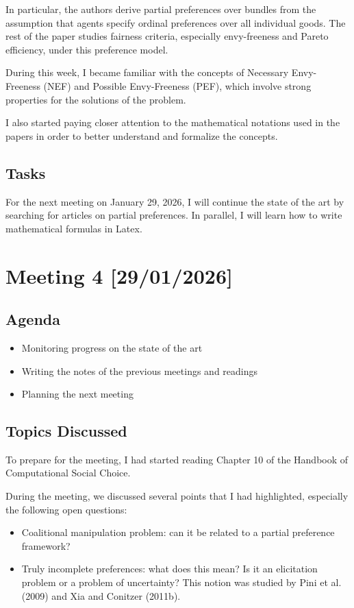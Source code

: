 \documentclass{article}
\begin{document}
In particular, the authors derive partial preferences over bundles from the assumption that agents specify ordinal preferences over all individual goods.
The rest of the paper studies fairness criteria, especially envy-freeness and Pareto efficiency, under this preference model.

During this week, I became familiar with the concepts of Necessary Envy-Freeness (NEF) and Possible Envy-Freeness (PEF), which involve strong properties for the solutions of the problem.

I also started paying closer attention to the mathematical notations used in the papers in order to better understand and formalize the concepts.

\subsection{Tasks}
For the next meeting on January 29, 2026, I will continue the state of the art by searching for articles on partial preferences.
In parallel, I will learn how to write mathematical formulas in Latex.
\newpage


\section{Meeting 4 [29/01/2026]}

\subsection{Agenda}
\begin{itemize}
    \item Monitoring progress on the state of the art
    \item Writing the notes of the previous meetings and readings
    \item Planning the next meeting
\end{itemize}

\subsection{Topics Discussed}

To prepare for the meeting, I had started reading Chapter 10 of the Handbook of Computational Social Choice.

During the meeting, we discussed several points that I had highlighted, especially the following open questions:
\begin{itemize}
    \item Coalitional manipulation problem: can it be related to a partial preference framework?
    \item Truly incomplete preferences: what does this mean? Is it an elicitation problem or a problem of uncertainty? This notion was studied by Pini et al. (2009) and Xia and Conitzer (2011b).
\end{itemize}
\end{document}

